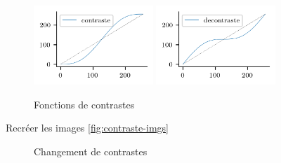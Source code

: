 \begin{figure}[h!]
    \begin{center}
        \includegraphics[width=0.4\textwidth]{figures/10/contraste_func.png}
        \includegraphics[width=0.4\textwidth]{figures/10/decontraste_func.png}
    \end{center}
    \caption{Fonctions de contrastes}
    \label{fig:contraste-funcs}
\end{figure}

\ssques Recréer les images \autoref{fig:contraste-imgs}

\begin{figure}[h!]
    \begin{center}
    \end{center}
    \caption{Changement de contrastes}
    \label{fig:contraste-imgs}
\end{figure}



